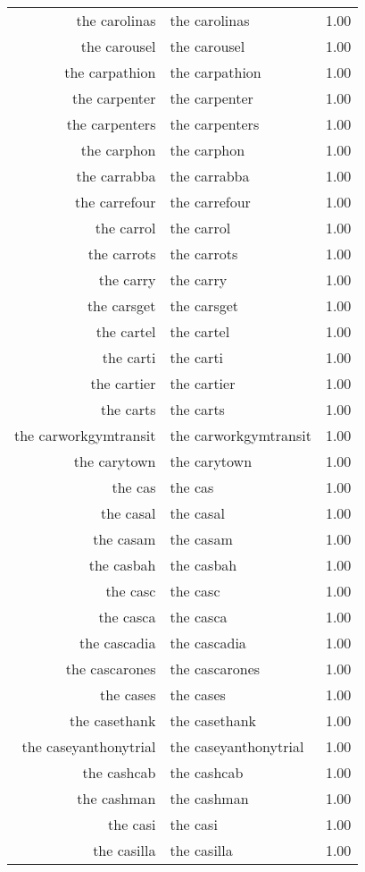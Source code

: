 \begin{table}[ht]
\begin{tabular}{rlr}
  the carolinas & the carolinas & 1.00 \\ 
  the carousel & the carousel & 1.00 \\ 
  the carpathion & the carpathion & 1.00 \\ 
  the carpenter & the carpenter & 1.00 \\ 
  the carpenters & the carpenters & 1.00 \\ 
  the carphon & the carphon & 1.00 \\ 
  the carrabba & the carrabba & 1.00 \\ 
  the carrefour & the carrefour & 1.00 \\ 
  the carrol & the carrol & 1.00 \\ 
  the carrots & the carrots & 1.00 \\ 
  the carry & the carry & 1.00 \\ 
  the carsget & the carsget & 1.00 \\ 
  the cartel & the cartel & 1.00 \\ 
  the carti & the carti & 1.00 \\ 
  the cartier & the cartier & 1.00 \\ 
  the carts & the carts & 1.00 \\ 
  the carworkgymtransit & the carworkgymtransit & 1.00 \\ 
  the carytown & the carytown & 1.00 \\ 
  the cas & the cas & 1.00 \\ 
  the casal & the casal & 1.00 \\ 
  the casam & the casam & 1.00 \\ 
  the casbah & the casbah & 1.00 \\ 
  the casc & the casc & 1.00 \\ 
  the casca & the casca & 1.00 \\ 
  the cascadia & the cascadia & 1.00 \\ 
  the cascarones & the cascarones & 1.00 \\ 
  the cases & the cases & 1.00 \\ 
  the casethank & the casethank & 1.00 \\ 
  the caseyanthonytrial & the caseyanthonytrial & 1.00 \\ 
  the cashcab & the cashcab & 1.00 \\ 
  the cashman & the cashman & 1.00 \\ 
  the casi & the casi & 1.00 \\ 
  the casilla & the casilla & 1.00 \\ 

\end{tabular}
\end{table}
